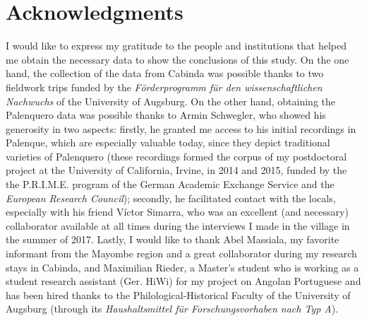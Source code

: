 \documentclass[output=paper,colorlinks,citecolor=brown]{langscibook}
\begin{document}
\section*{Acknowledgments}
I would like to express my gratitude to the people and institutions that helped me obtain the necessary data to show the conclusions of this study. On the one hand, the collection of the data from Cabinda was possible thanks to two fieldwork trips funded by the \textit{Förderprogramm für den wissenschaftlichen Nachwuchs} of the University of Augsburg. On the other hand, obtaining the Palenquero data was possible thanks to Armin Schwegler, who showed his generosity in two aspects: firstly, he granted me access to his initial recordings in Palenque, which are especially valuable today, since they depict traditional varieties of Palenquero (these recordings formed the corpus of my postdoctoral project at the University of California, Irvine, in 2014 and 2015, funded by the the P.R.I.M.E. program of the German Academic Exchange Service and the \textit{European Research Council}); secondly, he facilitated contact with the locals, especially with his friend Víctor Simarra, who was an excellent (and necessary) collaborator available at all times during the interviews I made in the village in the summer of 2017. Lastly, I would like to thank Abel Massiala, my favorite informant from the Mayombe region and a great collaborator during my research stays in Cabinda, and Maximilian Rieder, a Master’s student who is working as a student research assistant (Ger. HiWi) for my project on Angolan Portuguese and has been hired thanks to the Philological\hyp Historical Faculty of the University of Augsburg (through its \textit{Haushaltsmittel für Forschungsvorhaben nach Typ A}).

\largerpage[2]
{\sloppy\printbibliography[heading=subbibliography,notkeyword=this]}
\end{document}
